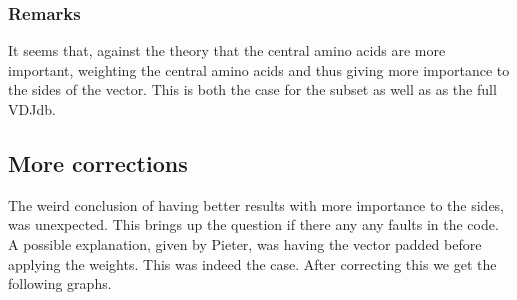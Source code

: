 \documentclass[11pt]{article}
\begin{document}
    \subsubsection{Remarks}

    It seems that, against the theory that the central amino acids are more important, weighting the central amino acids
    and thus giving more importance to the sides of the vector.
    This is both the case for the subset as well as as the full VDJdb.

    \subsection{More corrections}

    The weird conclusion of having better results with more importance to the sides, was unexpected.
    This brings up the question if there any any faults in the code.
    A possible explanation, given by Pieter, was having the vector padded before applying the weights.
    This was indeed the case.
    After correcting this we get the following graphs.
\end{document}
